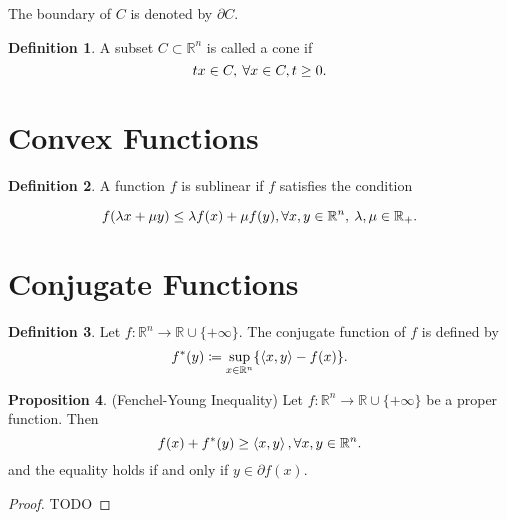 \documentclass[a4paper,11pt, oneside]{book}
\theoremstyle{definition}
\newtheorem{dfn}{Definition}[section]
\newtheorem{prop}[dfn]{Proposition}
\newcommand{\RealNumberSet}{\mathbb{R}}
\newcommand{\NDemenstionalRealEuclideanSpace}{\mathbb{R}^n}
\newcommand{\InnerProduct}[2]{\left\langle {#1},{#2}\right\rangle} %
\newcommand{\ExtendedRealValuedFunction}[2]{{#1}: {#2} \to \RealNumberSet \cup \{+\infty\}}
\newcommand{\ConjugateFunction}[1]{{#1}^*}
\begin{document}
The boundary of $C$ is denoted by $\partial C$.

\begin{dfn}
  A subset $C \subset \NDemenstionalRealEuclideanSpace$ is called a cone if
  \begin{equation}
    tx \in C,\:\forall x \in C, t\geq0. \notag
  \end{equation}
\end{dfn}

\section{Convex Functions}
\begin{dfn}
  A function $f$ is sublinear if $f$ satisfies the condition

  \begin{equation}
    f(\lambda x + \mu y) \leq \lambda f(x) + \mu f(y),\forall x, y \in{\NDemenstionalRealEuclideanSpace},\: \lambda, \mu \in{\RealNumberSet}_+. \notag
  \end{equation}
\end{dfn}

\section{Conjugate Functions}

\begin{dfn}
  Let $\ExtendedRealValuedFunction{f}{\NDemenstionalRealEuclideanSpace}$. The conjugate function of $f$ is defined by
  \begin{equation}
    \ConjugateFunction{f}(y) \coloneqq \sup_{x \in \NDemenstionalRealEuclideanSpace} \{ \InnerProduct{x}{y} - f(x) \}. \notag
  \end{equation}
\end{dfn}

\begin{prop}{(Fenchel-Young Inequality)}
  Let $\ExtendedRealValuedFunction{f}{\NDemenstionalRealEuclideanSpace}$ be a proper function. Then
  \begin{equation}
    f(x) + \ConjugateFunction{f}(y) \geq \InnerProduct{x}{y}, \forall x,y \in \NDemenstionalRealEuclideanSpace. \notag
  \end{equation}
  and the equality holds if and only if $y \in \partial f(x)$.
\end{prop}

\begin{proof}
  TODO
\end{proof}
\end{document}
